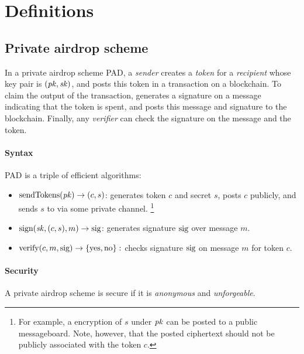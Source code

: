 \section{Definitions}\label{sec:defs}

\subsection{Private airdrop scheme}

In a private airdrop scheme PAD, a \emph{sender} \Sr creates a \emph{token}
    for a \emph{recipient} \Rt whose key pair is $(\mathit{pk}, \mathit{sk})$, and posts
    this token in a transaction on a blockchain.
To claim the output of the transaction, \Rt generates a signature on a message
    indicating that the token is spent, and posts this message and signature
    to the blockchain.
Finally, any \emph{verifier} \Vr can check the signature on the message
    and the token.

\paragraph{Syntax} PAD is a triple of efficient algorithms:
%
\begin{itemize}
\item $\text{sendTokens}(\mathit{pk}) \to (c, s)$:
%
\Sr generates token $c$ and secret $s$, posts $c$ publicly, and sends $s$
    to \Rt via some private channel.
\unskip\footnote{For example, a encryption of $s$ under $\mathit{pk}$ can be posted
    to a public messageboard. Note, however, that the posted ciphertext
    should not be publicly associated with the token $c$.}

\item $\text{sign}(\mathit{sk}, (c, s), m) \to \text{sig}$:
\Rt generates signature $\text{sig}$ over message $m$.

\item $\text{verify}(c, m, \text{sig}) \to \{\text{yes},\text{no}\}:$
\Vr checks signature $\text{sig}$ on message $m$ for token $c$.
\end{itemize}

\paragraph{Security} A private airdrop scheme is secure if it is \emph{anonymous} and \emph{unforgeable}.

